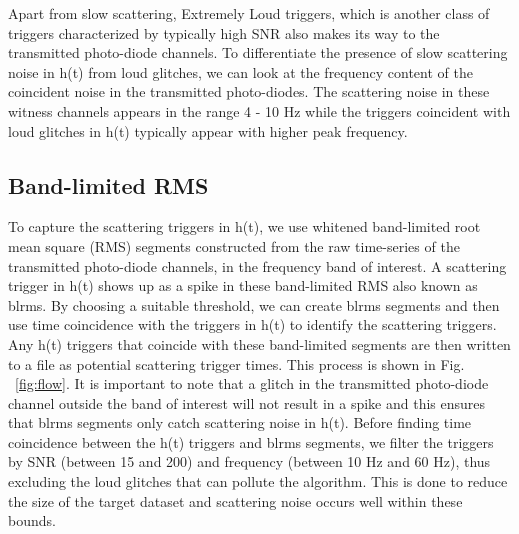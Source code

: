 \documentclass[12pt]{iopart}
\begin{document}
Apart from slow scattering, Extremely Loud triggers, which is another class of triggers characterized by typically high SNR also makes its way to the transmitted photo-diode channels. To differentiate the presence of slow scattering noise in h(t) from loud glitches, we can look at the frequency content of the coincident noise in the transmitted photo-diodes. The scattering noise in these witness channels appears in the range  4 - 10 Hz while the triggers coincident with loud glitches in h(t) typically appear with higher peak frequency. 

\subsection{Band-limited RMS}
To capture the scattering triggers in h(t), we use whitened band-limited root mean square (RMS) segments constructed from the raw time-series of the transmitted photo-diode channels, in the frequency band of interest. A scattering trigger in h(t) shows up as a spike in these band-limited RMS also known as blrms. By choosing a suitable threshold, we can create blrms segments and then use time coincidence with the triggers in h(t) to identify the scattering triggers. Any h(t) triggers that coincide with these band-limited segments are then written to a file as potential scattering trigger times.  This process is shown in Fig. ~\ref{fig:flow}. It is important to note that a glitch in the transmitted photo-diode channel outside the band of interest will not result in a spike and this ensures that blrms segments only catch scattering noise in h(t). Before finding time coincidence between the h(t) triggers and blrms segments, we filter the triggers by SNR (between 15 and 200) and frequency (between 10 Hz and 60 Hz), thus excluding the loud glitches that can pollute the algorithm. This is done to reduce the size of the target dataset and scattering noise occurs well within these bounds. 
\end{document}
